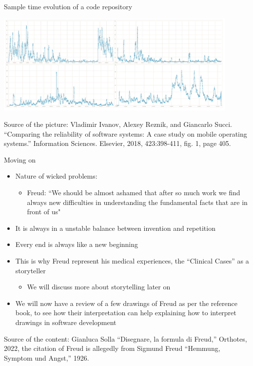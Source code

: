 \documentclass{beamer}
\begin{document}
\begin{frame}
{\centerline{Sample time evolution of a code repository}}

\begin{center}
 \includegraphics[width=12cm]{P2023.AIBCCSS.Drawing/issuesArrivals.jpg}
 
 \end{center}

\begin{center}
\tiny
Source of the picture: Vladimir Ivanov, Alexey Reznik, and Giancarlo Succi. ``Comparing the reliability of software systems: A case study on mobile operating systems.'' Information Sciences. Elsevier,  2018, 423:398-411, fig. 1, page 405.
\end{center}
\end{frame}

\begin{frame}
{\centerline{Moving on}}
\begin{itemize}
   \item Nature of wicked problems:
      \begin{itemize}
   \item Freud: ``We should be almost ashamed that after so much work we find always new difficulties in understanding the fundamental facts that are in front of us"
   \end{itemize} 
   \item It is always in a unstable balance between invention and repetition
   \item Every end is always like a new beginning
   \item This is why Freud represent his medical experiences, the ``Clinical Cases'' as a storyteller
    \begin{itemize}
   \item We will discuss more about storytelling later on
   \end{itemize} 
  \item We will now have a review of a few drawings of Freud as per the reference book, to see how their interpretation can help explaining how to interpret drawings in software development
 \end{itemize} 

\begin{center}
\tiny
Source of the content: Gianluca Solla ``Disegnare, la formula di Freud,'' Orthotes, 2022, the citation of Freud is allegedly from Sigmund Freud ``Hemmung, Symptom und Angst,'' 1926.
\end{center}
\end{frame}
\end{document}
